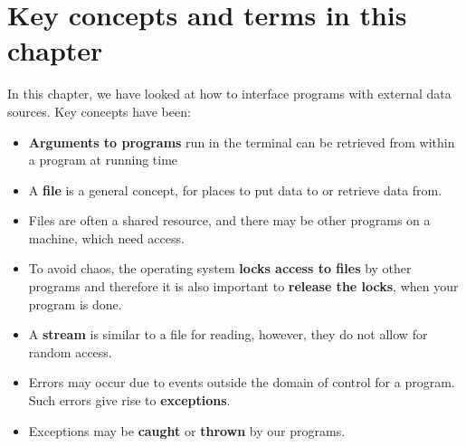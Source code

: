 \documentclass[fsharpNotes.tex]{subfiles}
\begin{document}
\section{Key concepts and terms in this chapter}
In this chapter, we have looked at how to interface programs with external data sources. Key concepts have been:
\begin{itemize}
\item \textbf{Arguments to programs} run in the terminal can be retrieved from within a program at running time
\item A \textbf{file} is a general concept, for places to put data to or retrieve data from.%
\item Files are often a shared resource, and there may be other programs on a machine, which need access.
\item To avoid chaos, the operating system \textbf{locks access to files} by other programs and therefore it is also important to \textbf{release the locks}, when your program is done.
\item A \textbf{stream} is similar to a file for reading, however, they do not allow for random access.
\item Errors may occur due to events outside the domain of control for a program. Such errors give rise to \textbf{exceptions}.
\item Exceptions may be \textbf{caught} or \textbf{thrown} by our programs.
\end{itemize}
\end{document}
